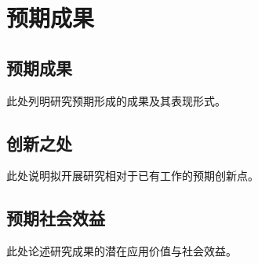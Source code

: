 \chapter{预期成果}

\section{预期成果}
此处列明研究预期形成的成果及其表现形式。

\section{创新之处}
此处说明拟开展研究相对于已有工作的预期创新点。

\section{预期社会效益}
此处论述研究成果的潜在应用价值与社会效益。
